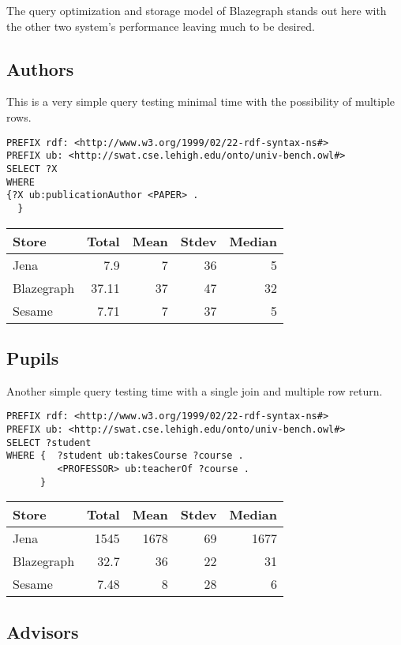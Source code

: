 \documentclass{llncs}
\begin{document}
The query optimization and storage model of Blazegraph stands out here with the other two system's performance leaving much to be desired.

\subsection{Authors}

This is a very simple query testing minimal time with the possibility of multiple rows.

\begin{lstlisting}
PREFIX rdf: <http://www.w3.org/1999/02/22-rdf-syntax-ns#>
PREFIX ub: <http://swat.cse.lehigh.edu/onto/univ-bench.owl#>
SELECT ?X
WHERE
{?X ub:publicationAuthor <PAPER> .
  }
\end{lstlisting}

\begin{tabular}{l | r r r r } Store & Total & Mean & Stdev & Median \\ \hline Jena & 7.9 & 7 & 36 & 5 \\ Blazegraph & 37.11 & 37 & 47 & 32 \\ Sesame & 7.71 & 7 & 37 & 5 \end{tabular}

\subsection{Pupils}

Another simple query testing time with a single join and multiple row return.

\begin{lstlisting}
PREFIX rdf: <http://www.w3.org/1999/02/22-rdf-syntax-ns#>
PREFIX ub: <http://swat.cse.lehigh.edu/onto/univ-bench.owl#>
SELECT ?student
WHERE {  ?student ub:takesCourse ?course .
         <PROFESSOR> ub:teacherOf ?course .
      }
\end{lstlisting}

\begin{tabular}{l | r r r r } Store & Total & Mean & Stdev & Median \\ \hline Jena & 1545 & 1678 & 69 & 1677 \\ Blazegraph & 32.7 & 36 & 22 & 31 \\ Sesame & 7.48 & 8 & 28 & 6 \end{tabular}

\subsection{Advisors}
\end{document}

